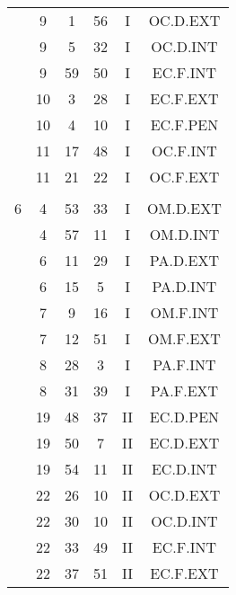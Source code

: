 \documentclass[12pt, a4paper]{article}
\begin{document}
\begin{multicols}{3}
{\begin{tabular}{c c c c c c}
	 	 	 	 & 9 & 1 & 56 & I & OC.D.EXT\\%
	 	 	 	 & 9 & 5 & 32 & I & OC.D.INT\\%
	 	 	 	 & 9 & 59 & 50 & I & EC.F.INT\\%
	 	 	 	 & 10 & 3 & 28 & I & EC.F.EXT\\%
	 	 	 	 & 10 & 4 & 10 & I & EC.F.PEN\\%
	 	 	 	 & 11 & 17 & 48 & I & OC.F.INT\\%
	 	 	 	 & 11 & 21 & 22 & I & OC.F.EXT\\%
	 	 	 	 & & & & & \\%
	 	 	 	6 & 4 & 53 & 33 & I & OM.D.EXT\\%
	 	 	 	 & 4 & 57 & 11 & I & OM.D.INT\\%
	 	 	 	 & 6 & 11 & 29 & I & PA.D.EXT\\%
	 	 	 	 & 6 & 15 & 5 & I & PA.D.INT\\%
	 	 	 	 & 7 & 9 & 16 & I & OM.F.INT\\%
	 	 	 	 & 7 & 12 & 51 & I & OM.F.EXT\\%
	 	 	 	 & 8 & 28 & 3 & I & PA.F.INT\\%
	 	 	 	 & 8 & 31 & 39 & I & PA.F.EXT\\%
	 	 	 	 & 19 & 48 & 37 & II & EC.D.PEN\\%
	 	 	 	 & 19 & 50 & 7 & II & EC.D.EXT\\%
	 	 	 	 & 19 & 54 & 11 & II & EC.D.INT\\%
	 	 	 	 & 22 & 26 & 10 & II & OC.D.EXT\\%
	 	 	 	 & 22 & 30 & 10 & II & OC.D.INT\\%
	 	 	 	 & 22 & 33 & 49 & II & EC.F.INT\\%
	 	 	 	 & 22 & 37 & 51 & II & EC.F.EXT\\%

\end{tabular}}
\end{multicols}
\end{document}
